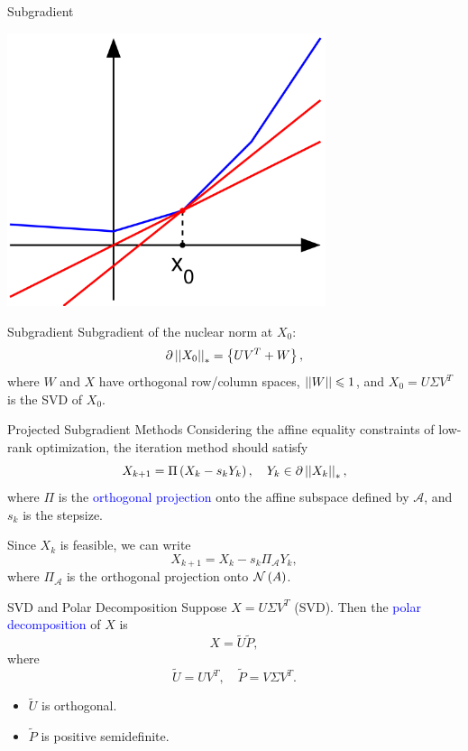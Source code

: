 \documentclass{beamer}
\newcommand{\blue}[1]{\textcolor{blue}{#1}}
\begin{document}
\begin{frame}{Subgradient}
    \begin{center}
        \includegraphics[width=0.7\textwidth]{img/Subderivative_illustration.png}
    \end{center}
\end{frame}

\begin{frame}{Subgradient}
    Subgradient of the nuclear norm at \(X_0\):
    \[\partial\left|\left|X_0\right|\right|_\ast=\left\{UV^T+W\right\},\]
    where \(W\) and \(X\) have orthogonal row/column spaces, \(\left|\left|W\right|\right|\leqslant 1\), and \(X_0=U\Sigma V^T\) is the SVD of \(X_0\).
\end{frame}

\begin{frame}{Projected Subgradient Methods}
    Considering the affine equality constraints of low-rank optimization, the iteration method should satisfy
    \[X_{k+1}=\Pi\left(X_k-s_kY_k\right),\quad Y_k\in\partial\left|\left|X_k\right|\right|_\ast,\]
    where \(\Pi\) is the \blue{orthogonal projection} onto the affine subspace defined by \(\mathcal A\), and \(s_k\) is the stepsize.
    \pause
    \par Since \(X_k\) is feasible, we can write
    \[X_{k+1}=X_k-s_k\Pi_{\mathcal A}Y_k,\]
    where \(\Pi_{\mathcal A}\) is the orthogonal projection onto \(\mathcal N\left(A\right)\).
\end{frame}

\begin{frame}{SVD and Polar Decomposition}
    Suppose \(X=U\Sigma V^T\) (SVD). Then the \blue{polar decomposition} of \(X\) is
    \[X=\tilde U\tilde P,\]
    where
    \[\tilde U=UV^T,\quad\tilde P=V\Sigma V^T.\]
    \begin{itemize}
        \item \(\tilde U\) is orthogonal.
        \item \(\tilde P\) is positive semidefinite.
    \end{itemize}
\end{frame}
\end{document}
